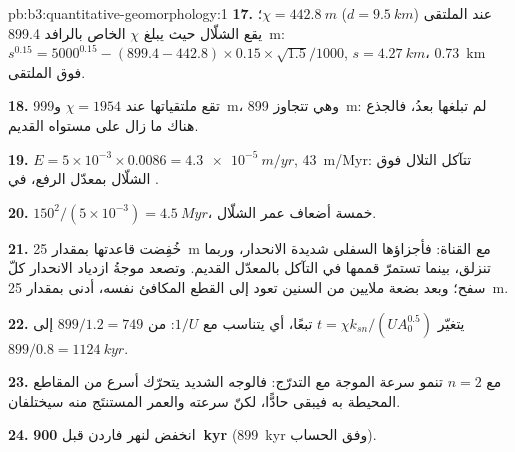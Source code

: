 \begin{solution}{pb:b3:quantitative-geomorphology:1}
\textbf{17.} عند الملتقى ($d = \qty{9.5}{km}$) $\chi = \qty{442.8}{m}$؛
يقع الشلّال حيث يبلغ $\chi$ الخاص بالرافد \qty{899.4}{m}:
$s^{0.15} = 5000^{0.15} - (899.4 - 442.8)\times0.15\times\sqrt{1.5}/1000$,
$s = \qty{4.27}{km}$، \qty{0.73}{km} فوق الملتقى.

\textbf{18.} تقع ملتقياتها عند $\chi = 1954$ و\qty{999}{m}، وهي تتجاوز
\qty{899}{m}: لم تبلغها  بعدُ، فالجذع هناك
ما زال على مستواه القديم.

\textbf{19.} $E = 5\times10^{-3}\times0.0086 = \qty{4.3e-5}{m/yr}$,
\qty{43}{m/Myr}: تتآكل التلال فوق الشلّال بمعدّل الرفع، في
.

\textbf{20.} $150^2/(5\times10^{-3}) = \qty{4.5}{Myr}$، خمسة أضعاف عمر
الشلّال.

\textbf{21.} خُفِضت قاعدتها بمقدار \qty{25}{m} مع القناة: فأجزاؤها
السفلى شديدة الانحدار، وربما تنزلق، بينما تستمرّ قممها في
التآكل بالمعدّل القديم. وتصعد موجةُ ازدياد الانحدار كلّ سفح؛ وبعد بضعة
ملايين من السنين تعود إلى القطع المكافئ نفسه، أدنى بمقدار \qty{25}{m}.

\textbf{22.} يتغيّر $t = \chi k_{sn}/(U A_0^{0.5})$ تبعًا، أي يتناسب مع $1/U$: من
$899/1.2 = 749$ إلى $899/0.8 = \qty{1124}{kyr}$.

\textbf{23.} مع $n = 2$ تنمو سرعة الموجة مع التدرّج: فالوجه الشديد
يتحرّك أسرع من المقاطع المحيطة به فيبقى حادًّا، لكنّ
سرعته والعمر المستنتَج منه سيختلفان.

\textbf{24.} انخفض  لنهر فاردن
قبل \textbf{\qty[text-series-to-math=true]{900}{kyr}} (\qty{899}{kyr} وفق
الحساب).
\end{solution}
